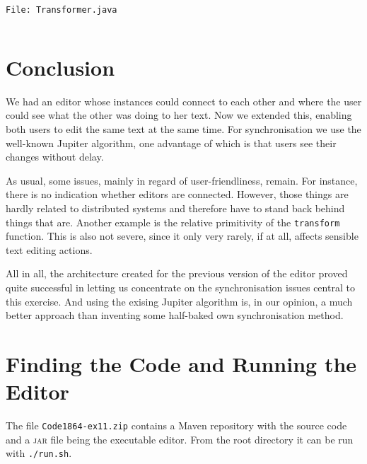 \documentclass[a4paper,final,12pt,oneside,article,table]{memoir}
\newcommand{\srcpath}{../ex09/src/main/java/ddist}
\newcommand{\inmnt}[3]{\vspace{1em}\noindent\texttt{\color{gray}File: #3}\vspace{-1em}\inputminted[tabsize=4,firstline=#1,firstnumber=#1,lastline=#2,linenos]{java}{\srcpath/#3}}
\newcommand{\mil}[1]{\texttt{#1}}
\begin{document}
\inmnt{149}{184}{Transformer.java}

\chapter{Conclusion}

We had an editor whose instances could connect to each other and where
the user could see what the other was doing to her text. Now we extended
this, enabling both users to edit the same text at the same time. For
synchronisation we use the well-known Jupiter algorithm, one advantage
of which is that users see their changes without delay.

As usual, some issues, mainly in regard of user-friendliness, remain.
For instance, there is no indication whether editors are connected.
However, those things are hardly related to distributed systems and
therefore have to stand back behind things that are. Another example is
the relative primitivity of the \mil{transform} function. This is also
not severe, since it only very rarely, if at all, affects sensible text
editing actions.

All in all, the architecture created for the previous version of the
editor proved quite successful in letting us concentrate on the
synchronisation issues central to this exercise. And using the exising
Jupiter algorithm is, in our opinion, a much better approach than
inventing some half-baked own synchronisation method.

\appendix

\chapter{Finding the Code and Running the Editor}

The file \texttt{Code1864-ex11.zip} contains a Maven repository with the source
code and a \textsc{jar} file being the executable editor. From the
root directory it can be run with \texttt{./run.sh}.


\setlength{\RaggedRightRightskip}{0pt plus 4em} %
\RaggedRight
\printbibliography
\end{document}
